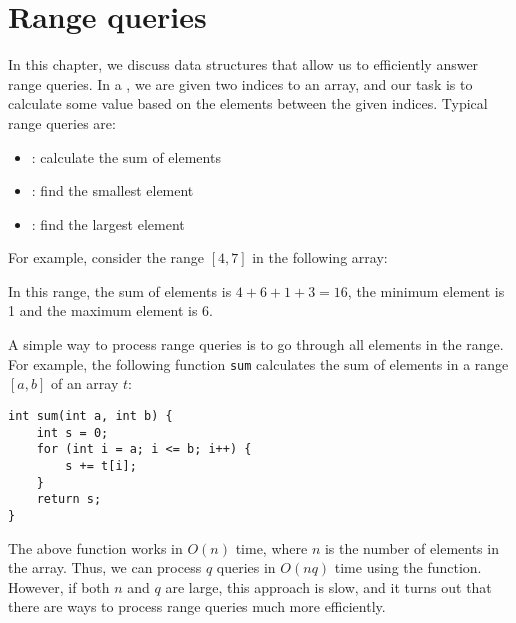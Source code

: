 \chapter{Range queries}


In this chapter, we discuss data structures
that allow us to efficiently answer range queries.
In a , we are given two indices
to an array, and our task is to calculate some
value based on the elements between the given indices.
Typical range queries are:
\begin{itemize}
\item {}: calculate the sum of elements
\item {}: find the smallest element
\item {}: find the largest element
\end{itemize}
For example, consider the range $[4,7]$ in the following array:
\begin{center}
\end{center}
In this range, the sum of elements is $4+6+1+3=16$,
the minimum element is 1 and the maximum element is 6.

A simple way to process range queries is to
go through all elements in the range.
For example, the following function \texttt{sum}
calculates the sum of elements in a range
$[a,b]$ of an array $t$:

\begin{lstlisting}
int sum(int a, int b) {
    int s = 0;
    for (int i = a; i <= b; i++) {
        s += t[i];
    }
    return s;
}
\end{lstlisting}

The above function works in $O(n)$ time,
where $n$ is the number of elements in the array.
Thus, we can process $q$ queries in $O(nq)$
time using the function.
However, if both $n$ and $q$ are large, this approach
is slow, and it turns out that there are
ways to process range queries much more efficiently.

